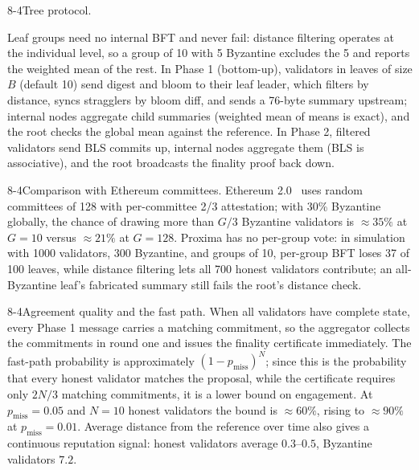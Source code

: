 \documentclass[runningheads]{llncs}
\makeatletter
\renewcommand\paragraph{\@startsection{paragraph}{4}{\z@}%
  {8\p@ \@plus 2\p@ \@minus 2\p@}{-4\p@}{\normalfont\normalsize\bfseries\boldmath}}
\makeatother
\begin{document}
\paragraph{Tree protocol.}
\label{sec:tree}

Leaf groups need no internal BFT and never fail: distance filtering operates at the individual level, so a group of 10 with 5 Byzantine excludes the 5 and reports the weighted mean of the rest. In Phase 1 (bottom-up), validators in leaves of size $B$ (default 10) send digest and bloom to their leaf leader, which filters by distance, syncs stragglers by bloom diff, and sends a 76-byte summary upstream; internal nodes aggregate child summaries (weighted mean of means is exact), and the root checks the global mean against the reference. In Phase 2, filtered validators send BLS commits up, internal nodes aggregate them (BLS is associative), and the root broadcasts the finality proof back down.

\paragraph{Comparison with Ethereum committees.}
\label{sec:eth-committees}
Ethereum 2.0~\cite{eth2spec} uses random committees of 128 with per-committee 2/3 attestation; with 30\% Byzantine globally, the chance of drawing more than $G/3$ Byzantine validators is $\approx 35\%$ at $G{=}10$ versus $\approx 21\%$ at $G{=}128$. Proxima has no per-group vote: in simulation with 1000 validators, 300 Byzantine, and groups of 10, per-group BFT loses 37 of 100 leaves, while distance filtering lets all 700 honest validators contribute; an all-Byzantine leaf's fabricated summary still fails the root's distance check.

\paragraph{Agreement quality and the fast path.}
\label{sec:agreement-quality}
When all validators have complete state, every Phase 1 message carries a matching commitment, so the aggregator collects the commitments in round one and issues the finality certificate immediately. The fast-path probability is approximately $(1 - p_{\mathrm{miss}})^N$; since this is the probability that every honest validator matches the proposal, while the certificate requires only $2N/3$ matching commitments, it is a lower bound on engagement. At $p_{\mathrm{miss}} = 0.05$ and $N = 10$ honest validators the bound is $\approx 60\%$, rising to $\approx 90\%$ at $p_{\mathrm{miss}} = 0.01$. Average distance from the reference over time also gives a continuous reputation signal: honest validators average $0.3$--$0.5$, Byzantine validators $7.2$.
\end{document}
